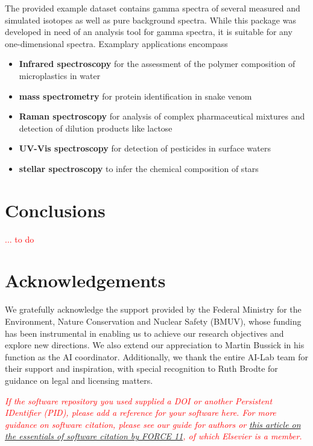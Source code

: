 \documentclass[preprint,12pt, a4paper]{elsarticle}
\begin{document}
The provided example dataset contains gamma spectra of several measured and simulated isotopes as well as pure background spectra. While this package was developed in need of an analysis tool for gamma spectra, it is suitable for any one-dimensional spectra. Examplary applications encompass  
\begin{itemize}
\item \textbf{Infrared spectroscopy} for the assessment of the polymer composition of 
microplastics in water \cite{Ferreiro2023, Whiting2022}  
\item \textbf{mass spectrometry} for protein identification in snake venom 
\cite{Zelanis2019, Yasemin2021}  
\item \textbf{Raman spectroscopy} for analysis of complex pharmaceutical mixtures and detection
of dilution products like lactose \cite{Fu2021}  
\item \textbf{UV-Vis spectroscopy} for detection of pesticides in surface waters \cite{Guo2020, Qi2024}
\item \textbf{stellar spectroscopy} to infer the chemical composition of stars \cite{Gray2021}  
\end{itemize}


\section{Conclusions}
\textcolor{red}{... to do}

\section*{Acknowledgements}
We gratefully acknowledge the support provided by the Federal Ministry for the Environment, Nature Conservation and Nuclear Safety (BMUV), whose funding has been instrumental in enabling us to achieve our research objectives and explore new directions. 
We also extend our appreciation to Martin Bussick in his function as the AI coordinator. 
Additionally, we thank the entire AI-Lab team for their support and inspiration, with special recognition to Ruth Brodte for guidance on legal and licensing matters.

 



\textcolor{red}{
\textit{If the software repository you used supplied a DOI or another
Persistent IDentifier (PID), please add a reference for your software
here. For more guidance on software citation, please see our guide for
authors or \href{https://f1000research.com/articles/9-1257/v2}{this
  article on the essentials of software citation by FORCE 11}, of
which Elsevier is a member.}
}
\end{document}

